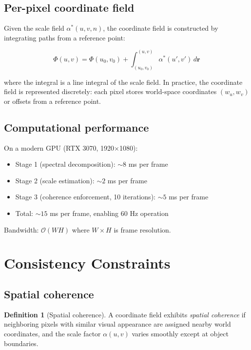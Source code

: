 \documentclass[11pt,twocolumn,a4paper]{article}
\theoremstyle{definition}
\newtheorem{definition}[theorem]{Definition}
\begin{document}
\subsection{Per-pixel coordinate field}

Given the scale field $\alpha^*(u,v,n)$, the coordinate field is constructed by integrating paths from a reference point:

\begin{equation}
\Phi(u,v) = \Phi(u_0, v_0) + \int_{(u_0,v_0)}^{(u,v)} \alpha^*(u',v') \, d\bm{r}
\end{equation}

where the integral is a line integral of the scale field. In practice, the coordinate field is represented discretely: each pixel stores world-space coordinates $(w_u, w_v)$ or offsets from a reference point.

\subsection{Computational performance}

On a modern GPU (RTX 3070, 1920$\times$1080):

\begin{itemize}[leftmargin=1.4em]
  \item Stage 1 (spectral decomposition): $\sim 8$ ms per frame
  \item Stage 2 (scale estimation): $\sim 2$ ms per frame
  \item Stage 3 (coherence enforcement, 10 iterations): $\sim 5$ ms per frame
  \item Total: $\sim 15$ ms per frame, enabling 60 Hz operation
\end{itemize}

Bandwidth: $\mathcal{O}(W H)$ where $W \times H$ is frame resolution.

\section{Consistency Constraints}
\label{sec:consistency}

\subsection{Spatial coherence}

\begin{definition}[Spatial coherence]
\label{def:spatial_coh}
A coordinate field exhibits \emph{spatial coherence} if neighboring pixels with similar visual appearance are assigned nearby world coordinates, and the scale factor $\alpha(u,v)$ varies smoothly except at object boundaries.
\end{definition}
\end{document}

